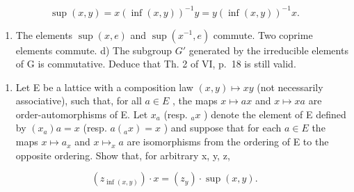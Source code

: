 \[
\sup (x, y) = x (\inf (x, y)) ^ {- 1} y = y (\inf (x, y)) ^ {- 1} x.
\]

\begin{enumerate}
\def\labelenumi{\alph{enumi})}
\setcounter{enumi}{2}
\tightlist
\item
  The elements \(\sup(x, e)\) and \(\sup(x^{-1}, e)\) commute. Two coprime elements commute. d) The subgroup \(G'\) generated by the irreducible elements of G is commutative. Deduce that Th. 2 of VI, p.~18 is still valid.
\end{enumerate}

\begin{enumerate}
\def\labelenumi{\arabic{enumi})}
\setcounter{enumi}{1}
\tightlist
\item
  Let E be a lattice with a composition law \((x, y) \mapsto xy\) (not necessarily associative), such that, for all \(a \in E\) , the maps \(x \mapsto ax\) and \(x \mapsto xa\) are order-automorphisms of E. Let \(x_{a}\) (resp. \(_{a}x\) ) denote the element of E defined by \((x_{a})a = x\) (resp. \(a(_{a}x) = x\) ) and suppose that for each \(a \in E\) the maps \(x \mapsto a_{x}\) and \(x \mapsto_{x} a\) are isomorphisms from the ordering of E to the opposite ordering. Show that, for arbitrary x, y, z,
\end{enumerate}

\[
\left(z _ {\inf (x, y)}\right) \cdot x = \left(z _ {y}\right) \cdot \sup (x, y).
\]


